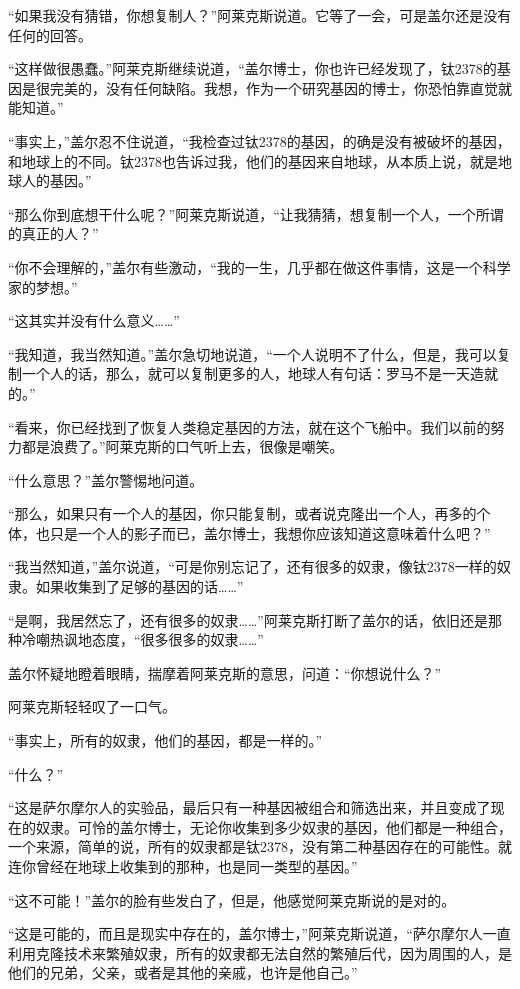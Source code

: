 “如果我没有猜错，你想复制人？”阿莱克斯说道。它等了一会，可是盖尔还是没有任何的回答。 

“这样做很愚蠢。”阿莱克斯继续说道，“盖尔博士，你也许已经发现了，钛2378的基因是很完美的，没有任何缺陷。我想，作为一个研究基因的博士，你恐怕靠直觉就能知道。” 

“事实上，”盖尔忍不住说道，“我检查过钛2378的基因，的确是没有被破坏的基因，和地球上的不同。钛2378也告诉过我，他们的基因来自地球，从本质上说，就是地球人的基因。” 

“那么你到底想干什么呢？”阿莱克斯说道，“让我猜猜，想复制一个人，一个所谓的真正的人？” 

“你不会理解的，”盖尔有些激动，“我的一生，几乎都在做这件事情，这是一个科学家的梦想。” 

“这其实并没有什么意义……” 

“我知道，我当然知道。”盖尔急切地说道，“一个人说明不了什么，但是，我可以复制一个人的话，那么，就可以复制更多的人，地球人有句话：罗马不是一天造就的。” 

“看来，你已经找到了恢复人类稳定基因的方法，就在这个飞船中。我们以前的努力都是浪费了。”阿莱克斯的口气听上去，很像是嘲笑。 

“什么意思？”盖尔警惕地问道。 

“那么，如果只有一个人的基因，你只能复制，或者说克隆出一个人，再多的个体，也只是一个人的影子而已，盖尔博士，我想你应该知道这意味着什么吧？” 

“我当然知道，”盖尔说道，“可是你别忘记了，还有很多的奴隶，像钛2378一样的奴隶。如果收集到了足够的基因的话……” 

“是啊，我居然忘了，还有很多的奴隶……”阿莱克斯打断了盖尔的话，依旧还是那种冷嘲热讽地态度，“很多很多的奴隶……” 

盖尔怀疑地瞪着眼睛，揣摩着阿莱克斯的意思，问道：“你想说什么？” 

阿莱克斯轻轻叹了一口气。 

“事实上，所有的奴隶，他们的基因，都是一样的。” 

“什么？” 

“这是萨尔摩尔人的实验品，最后只有一种基因被组合和筛选出来，并且变成了现在的奴隶。可怜的盖尔博士，无论你收集到多少奴隶的基因，他们都是一种组合，一个来源，简单的说，所有的奴隶都是钛2378，没有第二种基因存在的可能性。就连你曾经在地球上收集到的那种，也是同一类型的基因。” 

“这不可能！”盖尔的脸有些发白了，但是，他感觉阿莱克斯说的是对的。 

“这是可能的，而且是现实中存在的，盖尔博士，”阿莱克斯说道，“萨尔摩尔人一直利用克隆技术来繁殖奴隶，所有的奴隶都无法自然的繁殖后代，因为周围的人，是他们的兄弟，父亲，或者是其他的亲戚，也许是他自己。” 

